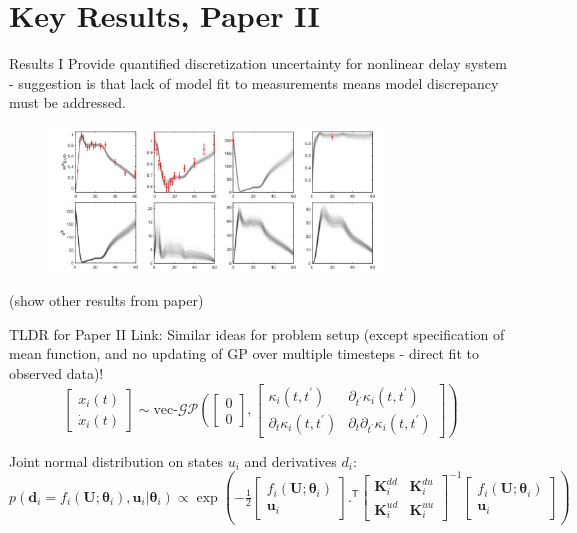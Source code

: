 \documentclass[usenames,dvipsnames]{beamer}
\theoremstyle{definition}
\let\oldcite=\cite
\renewcommand{\cite}[2][]{\textcolor{green}{\oldcite[#1]{#2}}}
\begin{document}
\section{Key Results, Paper II}
\begin{frame}{Results I}
    Provide quantified discretization uncertainty for nonlinear delay system - suggestion is that lack of model fit to measurements means model discrepancy must be addressed.

    \begin{figure}
        \centering
        \includegraphics[width=0.8\textwidth]{disc_uc.png}
        \label{f: disc_uc}
    \end{figure}


    (show other results from paper)
\end{frame}

\begin{frame}{TLDR for Paper II}
Link: \cite{ye_gaussian_2023}
Similar ideas for problem setup (except specification of mean function, and no updating of GP over multiple timesteps - direct fit to observed data)!
$$\left.\begin{bmatrix}x_i(t)\\\dot{x}_i(t)\end{bmatrix}\sim\text{vec-}\mathcal{GP}\left(\begin{bmatrix}0\\0\end{bmatrix}\right.,\begin{bmatrix}\kappa_i(t,t^{\prime})&\partial_{t^{\prime}}\kappa_i(t,t^{\prime})\\\partial_t\kappa_i(t,t^{\prime})&\partial_t\partial_{t^{\prime}}\kappa_i(t,t^{\prime})\end{bmatrix}\right)$$


Joint normal distribution on states $u_i$ and derivatives $d_i$:
$p\left(\mathbf{d}_{i}=f_{i}(\mathbf{U};\boldsymbol{\theta}_{i}),\mathbf{u}_{i}|\boldsymbol{\theta}_{i}\right)\propto\exp \left ( -\frac12\begin{bmatrix}f_{i}(\mathbf{U};\boldsymbol{\theta}_{i})\\\mathbf{u}_{i}\end{bmatrix}.^{\mathsf{T}}\begin{bmatrix}\mathbf{K}_{i}^{dd}&\mathbf{K}_{i}^{du}\\\mathbf{K}_{i}^{ud}&\mathbf{K}_{i}^{uu}\end{bmatrix}^{-1}\begin{bmatrix}f_{i}(\mathbf{U};\boldsymbol{\theta}_{i})\\\mathbf{u}_{i}\end{bmatrix} \right )$
\end{frame}
\end{document}
